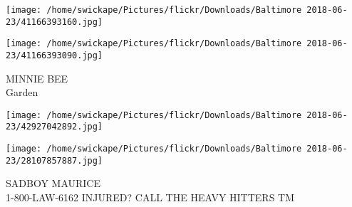 \documentclass[10pt,letterpaper]{article}
\begin{document}
\texttt{[image: /home/swickape/Pictures/flickr/Downloads/Baltimore 2018-06-23/41166393160.jpg]}

\vspace{0.25in}
\texttt{[image: /home/swickape/Pictures/flickr/Downloads/Baltimore 2018-06-23/41166393090.jpg]}

MINNIE BEE\\
Garden\\
\pagebreak

\texttt{[image: /home/swickape/Pictures/flickr/Downloads/Baltimore 2018-06-23/42927042892.jpg]}

\vspace{0.25in}
\texttt{[image: /home/swickape/Pictures/flickr/Downloads/Baltimore 2018-06-23/28107857887.jpg]}

SADBOY MAURICE\\
1{-}800{-}LAW{-}6162 INJURED?  CALL THE HEAVY HITTERS TM\\
\pagebreak
\end{document}
